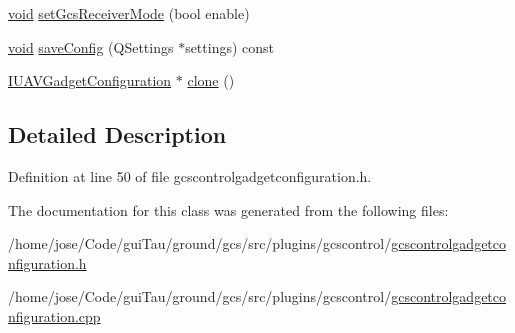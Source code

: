 \begin{DoxyCompactItemize}
\item 
\hyperlink{group___u_a_v_objects_plugin_ga444cf2ff3f0ecbe028adce838d373f5c}{void} \hyperlink{group___g_c_s_control_gadget_plugin_gac753abb3d8930e2296c8e9c056a4ee1f}{set\-Gcs\-Receiver\-Mode} (bool enable)
\item 
\hyperlink{group___u_a_v_objects_plugin_ga444cf2ff3f0ecbe028adce838d373f5c}{void} \hyperlink{group___g_c_s_control_gadget_plugin_ga5b7df7d2f0deddc5241efd65f199fb05}{save\-Config} (Q\-Settings $\ast$settings) const 
\item 
\hyperlink{group___core_plugin_gacdfdf0b1e39b5002472b76b6564ce51f}{I\-U\-A\-V\-Gadget\-Configuration} $\ast$ \hyperlink{group___g_c_s_control_gadget_plugin_ga2fcb5b20028b10d2b13fcebe34b82f0f}{clone} ()
\end{DoxyCompactItemize}


\subsection{Detailed Description}


Definition at line 50 of file gcscontrolgadgetconfiguration.\-h.



The documentation for this class was generated from the following files\-:\begin{DoxyCompactItemize}
\item 
/home/jose/\-Code/gui\-Tau/ground/gcs/src/plugins/gcscontrol/\hyperlink{gcscontrolgadgetconfiguration_8h}{gcscontrolgadgetconfiguration.\-h}\item 
/home/jose/\-Code/gui\-Tau/ground/gcs/src/plugins/gcscontrol/\hyperlink{gcscontrolgadgetconfiguration_8cpp}{gcscontrolgadgetconfiguration.\-cpp}\end{DoxyCompactItemize}
